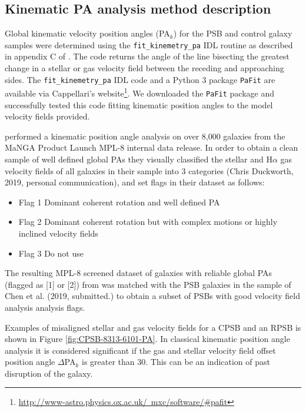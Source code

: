 \subsection{Kinematic PA analysis method description}
\label{sec:kinemetry-analysis-method-description}
Global kinematic velocity position angles (PA$_{k}$) for the PSB and control galaxy samples were determined using the \texttt{fit\_kinemetry\_pa} IDL routine as described in appendix C of \cite{2006MNRAS.366..787K}. The code returns the angle of the line bisecting the greatest change in a stellar or gas velocity field between the receding and approaching sides. The \texttt{fit\_kinemetry\_pa} IDL code and a Python 3 package \texttt{PaFit} are available via Cappellari's website\footnote{\href{http://www-astro.physics.ox.ac.uk/~mxc/software/\#pafit}{http://www-astro.physics.ox.ac.uk/~mxc/software/\#pafit}}. We downloaded the \texttt{PaFit} package and successfully tested this code fitting kinematic position angles to the model velocity fields provided. 


\cite{2019MNRAS.483..172D} performed a kinematic position angle analysis on over 8,000 galaxies from the MaNGA Product Launch MPL-8 internal data release. In order to obtain a clean sample of well defined global PAs they visually classified the stellar and H$\alpha$ gas velocity fields of all galaxies in their sample into 3 categories (Chris Duckworth, 2019, personal communication), and set flags in their dataset as follows:

\begin{itemize}
    \item {Flag 1}  Dominant coherent rotation and well defined PA
    \item {Flag 2}  Dominant coherent rotation but with complex motions or highly inclined velocity fields 
    \item {Flag 3}  Do not use
\end{itemize}

The resulting MPL-8 screened dataset of galaxies with reliable global PAs (flagged as [1] or [2]) from \cite{2019MNRAS.483..172D} was matched with the PSB galaxies in the sample of Chen et al. (2019, submitted.) to obtain a subset of PSBs with good velocity field analysis analysis flags.

Examples of misaligned stellar and gas velocity fields for a CPSB and an RPSB is shown in Figure \ref{fig:CPSB-8313-6101-PA}. In classical kinematic position angle analysis it is considered significant if the gas and stellar velocity field offset position angle $\Delta$PA$_{k}$ is greater than 30\textdegree. This can be an indication of past disruption of the galaxy.

